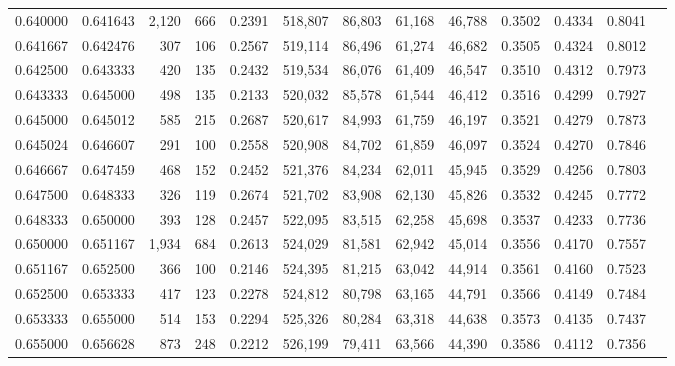 \begin{tabular}{rrrrrrrrrrrrr}
0.640000 & 0.641643 & 2,120 & 666 &                                     0.2391 & 518,807 &  86,803 &  61,168 &  46,788 & 0.3502 & 0.4334 & 0.8041 \\
0.641667 & 0.642476 &   307 & 106 &                                     0.2567 & 519,114 &  86,496 &  61,274 &  46,682 & 0.3505 & 0.4324 & 0.8012 \\
0.642500 & 0.643333 &   420 & 135 &                                     0.2432 & 519,534 &  86,076 &  61,409 &  46,547 & 0.3510 & 0.4312 & 0.7973 \\
0.643333 & 0.645000 &   498 & 135 &                                     0.2133 & 520,032 &  85,578 &  61,544 &  46,412 & 0.3516 & 0.4299 & 0.7927 \\
0.645000 & 0.645012 &   585 & 215 &                                     0.2687 & 520,617 &  84,993 &  61,759 &  46,197 & 0.3521 & 0.4279 & 0.7873 \\
0.645024 & 0.646607 &   291 & 100 &                                     0.2558 & 520,908 &  84,702 &  61,859 &  46,097 & 0.3524 & 0.4270 & 0.7846 \\
0.646667 & 0.647459 &   468 & 152 &                                     0.2452 & 521,376 &  84,234 &  62,011 &  45,945 & 0.3529 & 0.4256 & 0.7803 \\
0.647500 & 0.648333 &   326 & 119 &                                     0.2674 & 521,702 &  83,908 &  62,130 &  45,826 & 0.3532 & 0.4245 & 0.7772 \\
0.648333 & 0.650000 &   393 & 128 &                                     0.2457 & 522,095 &  83,515 &  62,258 &  45,698 & 0.3537 & 0.4233 & 0.7736 \\
0.650000 & 0.651167 & 1,934 & 684 &                                     0.2613 & 524,029 &  81,581 &  62,942 &  45,014 & 0.3556 & 0.4170 & 0.7557 \\
0.651167 & 0.652500 &   366 & 100 &                                     0.2146 & 524,395 &  81,215 &  63,042 &  44,914 & 0.3561 & 0.4160 & 0.7523 \\
0.652500 & 0.653333 &   417 & 123 &                                     0.2278 & 524,812 &  80,798 &  63,165 &  44,791 & 0.3566 & 0.4149 & 0.7484 \\
0.653333 & 0.655000 &   514 & 153 &                                     0.2294 & 525,326 &  80,284 &  63,318 &  44,638 & 0.3573 & 0.4135 & 0.7437 \\
0.655000 & 0.656628 &   873 & 248 &                                     0.2212 & 526,199 &  79,411 &  63,566 &  44,390 & 0.3586 & 0.4112 & 0.7356 \\

\end{tabular}
